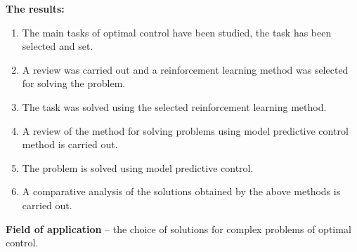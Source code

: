\textbf{The results:} 
\begin{enumerate}
	\item The main tasks of optimal control have been studied, the task has been selected and set.
	\item A review was carried out and a reinforcement learning method was selected for solving the problem.
	\item The task was solved using the selected reinforcement learning method.
	\item A review of the method for solving problems using model predictive control method is carried out.
	\item The problem is solved using model predictive control.
	\item A comparative analysis of the solutions obtained by the above methods is carried out.
\end{enumerate}

\textbf{Field of application} -- the choice of solutions for complex problems of optimal control.